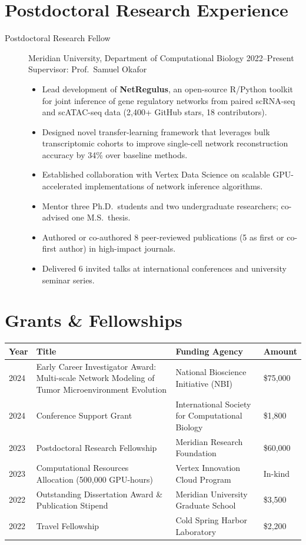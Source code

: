 \documentclass[11pt,a4paper]{article}
\newcommand{\grantrow}[4]{%
  #1 & #2 & #3 & #4 \\
}
\begin{document}
\section{Postdoctoral Research Experience}

\begin{description}
  \item[Postdoctoral Research Fellow] Meridian University, Department of Computational Biology \hfill 2022--Present\\
  Supervisor: Prof.\ Samuel Okafor

  \begin{itemize}
    \item Lead development of \textbf{NetRegulus}, an open-source R/Python toolkit for joint inference of gene regulatory networks from paired scRNA-seq and scATAC-seq data (2{,}400+ GitHub stars, 18 contributors).
    \item Designed novel transfer-learning framework that leverages bulk transcriptomic cohorts to improve single-cell network reconstruction accuracy by 34\% over baseline methods.
    \item Established collaboration with Vertex Data Science on scalable GPU-accelerated implementations of network inference algorithms.
    \item Mentor three Ph.D.\ students and two undergraduate researchers; co-advised one M.S.\ thesis.
    \item Authored or co-authored 8 peer-reviewed publications (5 as first or co-first author) in high-impact journals.
    \item Delivered 6 invited talks at international conferences and university seminar series.
  \end{itemize}
\end{description}

\section{Grants \& Fellowships}

{\small
\begin{tabularx}{\textwidth}{C{0.11\textwidth} L{0.43\textwidth} L{0.26\textwidth} C{0.14\textwidth}}
\toprule
{}
\textbf{Year} & \textbf{Title} & \textbf{Funding Agency} & \textbf{Amount} \\
\midrule
\grantrow{2024}{Early Career Investigator Award: Multi-scale Network Modeling of Tumor Microenvironment Evolution}{National Bioscience Initiative (NBI)}{\$75{,}000}
\grantrow{2024}{Conference Support Grant}{International Society for Computational Biology}{\$1{,}800}
\grantrow{2023}{Postdoctoral Research Fellowship}{Meridian Research Foundation}{\$60{,}000}
\grantrow{2023}{Computational Resources Allocation (500{,}000 GPU-hours)}{Vertex Innovation Cloud Program}{In-kind}
\grantrow{2022}{Outstanding Dissertation Award \& Publication Stipend}{Meridian University Graduate School}{\$3{,}500}
\grantrow{2022}{Travel Fellowship}{Cold Spring Harbor Laboratory}{\$2{,}200}
\bottomrule
\end{tabularx}
}
\end{document}
